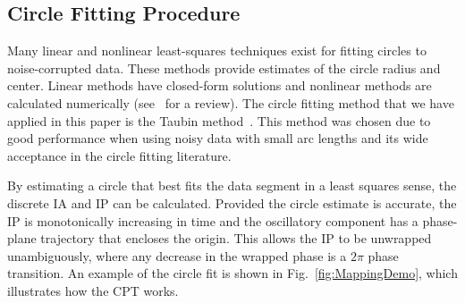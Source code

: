 \documentclass[a4paper]{IEEEtran}
\begin{document}
\subsection{Circle Fitting Procedure}\label{sect:CircleFittingProcedure}

Many linear and nonlinear least-squares techniques exist for fitting circles to noise-corrupted data. These methods provide estimates of the circle radius and center. Linear methods have closed-form solutions and nonlinear methods are calculated numerically (see~\cite{Chernov2005} for a review). The circle fitting method that we have applied in this paper is the Taubin method~\cite{Taubin1991}. This method was chosen due to good performance when using noisy data with small arc lengths and its wide acceptance in the circle fitting literature.

By estimating a circle that best fits the data segment in a least squares sense, the discrete IA and IP can be calculated. Provided the circle estimate is accurate, the IP is monotonically increasing in time and the oscillatory component has a phase-plane trajectory that encloses the origin. This allows the IP to be unwrapped unambiguously, where any decrease in the wrapped phase is a $2\pi$ phase transition. An example of the circle fit is shown in Fig.~\ref{fig:MappingDemo}, which illustrates how the CPT works.
\end{document}
